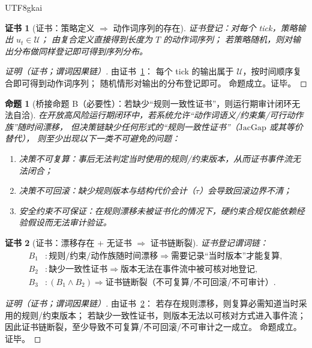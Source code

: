 \documentclass[12pt]{article}
\newtheorem{proposition}{命题}[section]
\newtheorem{Certificate}{证书}[section]
\newcommand{\JacGap}{\ensuremath{\mathrm{JacGap}}} %
\begin{document}
\begin{CJK*}{UTF8}{gkai}
\begin{Certificate}[证书：策略定义 $\Rightarrow$ 动作词序列的存在]
\label{cert:bridge-a-representation}
证书登记：对每个 tick，策略输出 $u_t\in\mathcal{U}$；
由复合定义直接得到长度为 $T$ 的动作词序列；
若策略随机，则对输出分布做同样登记即可得到序列分布。
\end{Certificate}

\begin{proof}[证明（证书；谓词因果链）]
由证书~\ref{cert:bridge-a-representation}：
每个 tick 的输出属于 $\mathcal{U}$，按时间顺序复合即可得到动作词序列；
随机情形对输出的分布登记即可。
命题成立。证毕。
\end{proof}

\begin{proposition}[桥接命题 B（必要性）：若缺少“规则一致性证书”，则运行期审计闭环无法自洽]
\label{prop:bridge-b-necessity}
在开放高风险运行期闭环中，若系统允许“动作词语义/约束集/可行动作族”随时间漂移，
但决策链缺少任何形式的“规则一致性证书”（\JacGap{} 或其等价替代），
则至少出现以下一类不可避免的问题：
\begin{enumerate}
  \item 决策不可复算：事后无法判定当时使用的规则/约束版本，从而证书事件流无法闭合；
  \item 决策不可回滚：缺少规则版本与结构代价会计（$\tau$）会导致回滚边界不清；
  \item 安全约束不可保证：在规则漂移未被证书化的情况下，硬约束合规仅能依赖经验假设而无法审计验证。
\end{enumerate}
\end{proposition}

\begin{Certificate}[证书：漂移存在 + 无证书 $\Rightarrow$ 证书链断裂]
\label{cert:bridge-b-necessity}
证书登记谓词链：
\[
\begin{aligned}
  B_1 &: \text{规则/约束/动作族随时间漂移} \Rightarrow \text{需要记录“当时版本”才能复算},\\
  B_2 &: \text{缺少一致性证书} \Rightarrow \text{版本无法在事件流中被可核对地登记},\\
  B_3 &: (B_1\wedge B_2) \Rightarrow \text{证书链断裂（不可复算/不可回滚/不可审计）}.
\end{aligned}
\]
\end{Certificate}

\begin{proof}[证明（证书；谓词因果链）]
由证书~\ref{cert:bridge-b-necessity}：
若存在规则漂移，则复算必需知道当时采用的规则/约束版本；
若缺少一致性证书，则版本无法以可核对方式进入事件流；
因此证书链断裂，至少导致不可复算/不可回滚/不可审计之一成立。
命题成立。证毕。
\end{proof}


\end{CJK*}
\end{document}
